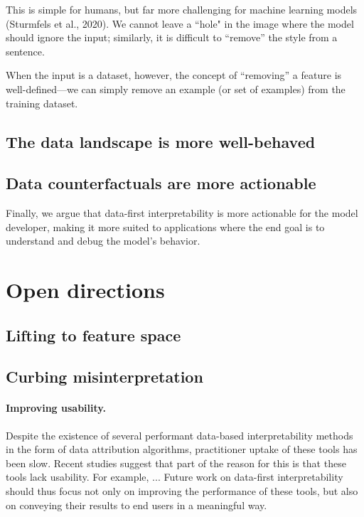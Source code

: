 \documentclass{article}
\begin{document}
This is simple for humans, but far more challenging for machine learning models
(Sturmfels et al., 2020). 
We cannot leave a “hole" in the image where 
the model should ignore the input; similarly, it is difficult to 
``remove'' the style from a sentence.

When the input is a dataset, however, the concept of ``removing'' a feature is 
well-defined---we can simply remove an example (or set of examples) from the 
training dataset.



\subsection{The data landscape is more well-behaved}

\subsection{Data counterfactuals are more actionable}
Finally, we argue that data-first interpretability is more actionable 
for the model developer, making it more suited to applications where 
the end goal is to understand and debug the model's behavior.

\section{Open directions}

\subsection{Lifting to feature space}
\subsection{Curbing misinterpretation}

\paragraph{Improving usability.}
Despite the existence of several performant data-based interpretability methods
in the form of data attribution algorithms, practitioner uptake of these 
tools has been slow. 
Recent studies \citep{nguyen2023exploring} suggest 
that part of the reason for this is that these tools lack 
usability.
For example, ...
Future work on data-first interpretability should thus focus not only 
on improving the performance of these tools, 
but also on conveying their results to end users in a meaningful way.
\end{document}
